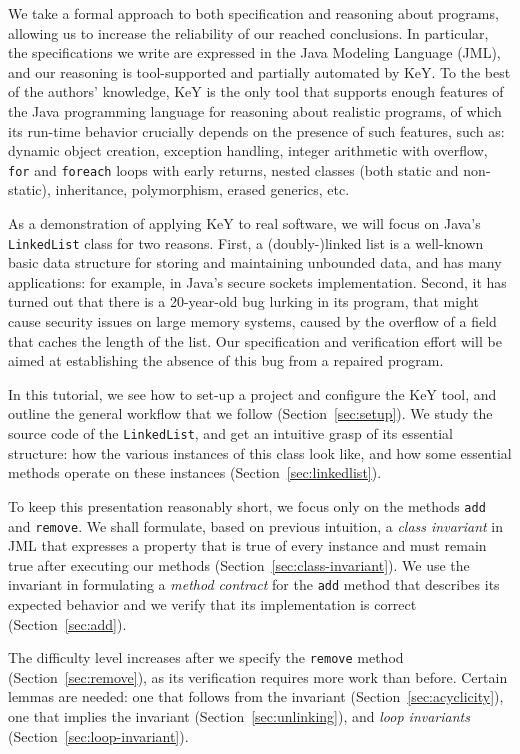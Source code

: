 \documentclass[runningheads]{llncs}
\begin{document}
We take a formal approach to both specification and reasoning about programs, allowing us to increase the reliability of our reached conclusions. In particular, the specifications we write are expressed in the Java Modeling Language (JML), and our reasoning is tool-supported and partially automated by KeY. To the best of the authors' knowledge, KeY is the only tool that supports enough features of the Java programming language for reasoning about realistic programs, of which its run-time behavior crucially depends on the presence of such features, such as: dynamic object creation, exception handling, integer arithmetic with overflow, \texttt{for} and \texttt{foreach} loops with early returns, nested classes (both static and non-static), inheritance, polymorphism, erased generics, etc.

As a demonstration of applying KeY to real software, we will focus on Java's \texttt{LinkedList} class for two reasons. First, a (doubly-)linked list is a well-known basic data structure for storing and maintaining unbounded data, and has many applications: for example, in Java's secure sockets implementation. Second, it has turned out that there is a 20-year-old bug lurking in its program, that might cause security issues on large memory systems, caused by the overflow of a field that caches the length of the list. Our specification and verification effort will be aimed at establishing the absence of this bug from a repaired program.

In this tutorial, we see how to set-up a project and configure the KeY tool, and outline the general workflow that we follow (Section~\ref{sec:setup}). We study the source code of the \texttt{LinkedList}, and get an intuitive grasp of its essential structure: how the various instances of this class look like, and how some essential methods operate on these instances (Section~\ref{sec:linkedlist}).

To keep this presentation reasonably short, we focus only on the methods \texttt{add} and \texttt{remove}. We shall formulate, based on previous intuition, a \emph{class invariant} in JML that expresses a property that is true of every instance and must remain true after executing our methods (Section~\ref{sec:class-invariant}). We use the invariant in formulating a \emph{method contract} for the \texttt{add} method that describes its expected behavior and we verify that its implementation is correct (Section~\ref{sec:add}).

The difficulty level increases after we specify the \texttt{remove} method (Section~\ref{sec:remove}), as its verification requires more work than before. Certain lemmas are needed: one that follows from the invariant (Section~\ref{sec:acyclicity}), one that implies the invariant (Section~\ref{sec:unlinking}), and \emph{loop invariants} (Section~\ref{sec:loop-invariant}).
\end{document}
